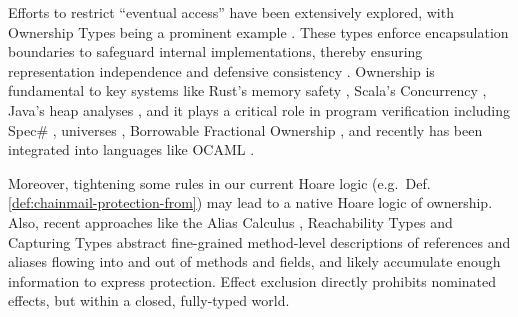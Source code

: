    Efforts to restrict ``eventual access'' have been extensively explored, with
 Ownership Types  being a prominent example \cite{simpleOwnership,existOwn}.
These types enforce encapsulation boundaries to safeguard internal implementations, thereby ensuring representation independence and defensive consistency
\cite{ownalias,NobPotVitECOOP98,Banerjee:2005}.
Ownership is fundamental to key systems like Rust’s memory safety  
\cite{RustPL2,RustBelt18},
Scala's Concurrency \cite{ScalaCapabilities,ScalaLightweightAffine},
Java's heap analyses \cite{PotterNC98,HillNP02,MitECOOP06}, 
and it  plays a critical role in program verification
\cite{BoyLisShrPOPL03,hypervisor} including Spec$\#$
\cite{BarLeiSch05,BarDelFahLeiSch04}, universes
\cite{DieDroMue07,DietlMueller05,LuPotPOPL06},
Borrowable Fractional Ownership \cite{borrow-fract-vmcai2024},
and recently has been integrated into languages like OCAML \cite{ocaml-ownership-icfp2024,funk-ownership-oopsla2024}.


Moreover,  tightening some
rules in our current Hoare logic (e.g.\ Def. \ref{def:chainmail-protection-from})
may lead to a native  Hoare logic of ownership.
Also, recent approaches like
%
%
the Alias
Calculus \cite{meyer-alias-calculus-scp2015,meyer-auto-alias-sncs2020},
Reachability
Types \cite{romf-reachability-types-oopsla2021,rompf-poly-reachability-popl2024}
and Capturing
Types \cite{odersky-capturing-types-toplas2023,scoped-effects-oopsla2022,odersky-reach-prog2024}
abstract fine-grained method-level descriptions of 
references and aliases flowing into and out of methods and fields,
and likely accumulate enough information to express 
protection. Effect exclusion
\cite{fx-exclusion-icfp2023} directly prohibits nominated
effects, but within a closed, fully-typed world.



